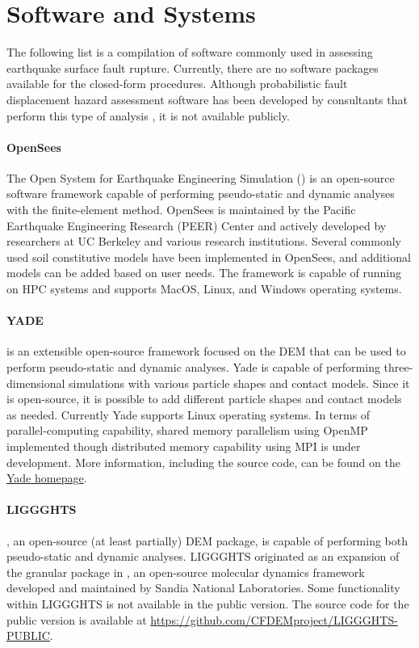 \section{Software and Systems}
\label{sec:eq_surface_rup_tools}

The following list is a compilation of software commonly used in assessing earthquake surface fault rupture. Currently, there are no software packages available for the closed-form procedures. Although probabilistic fault displacement hazard assessment software has been developed by consultants that perform this type of analysis \citep{wells2014probabilistic}, it is not available publicly.

\paragraph{OpenSees}
The Open System for Earthquake Engineering Simulation () is an open-source software framework capable of performing pseudo-static and dynamic analyses with the finite-element method. OpenSees is maintained by the Pacific Earthquake Engineering Research (PEER) Center and actively developed by researchers at UC Berkeley and various research institutions. Several commonly used soil constitutive models have been implemented in OpenSees, and additional models can be added based on user needs. The framework is capable of running on HPC systems and supports MacOS, Linux, and Windows operating systems.

\paragraph{YADE}
 is an extensible open-source framework focused on the DEM \citep{yade2005doc} that can be used to perform pseudo-static and dynamic analyses. Yade is capable of performing three-dimensional simulations with various particle shapes and contact models. Since it is open-source, it is possible to add different particle shapes and contact models as needed. Currently Yade supports Linux operating systems. In terms of parallel-computing capability, shared memory parallelism using OpenMP implemented though distributed memory capability using MPI is under development. More information, including the source code, can be found on the \href{https://yade-dem.org/doc/}{Yade homepage}.

\paragraph{LIGGGHTS}
, an open-source (at least partially) DEM package, is capable of performing both pseudo-static and dynamic analyses. LIGGGHTS originated as an expansion of the granular package in , an open-source molecular dynamics framework developed and maintained by Sandia National Laboratories. Some functionality within LIGGGHTS is not available in the public version. The source code for the public version is available at \url{https://github.com/CFDEMproject/LIGGGHTS-PUBLIC}.


